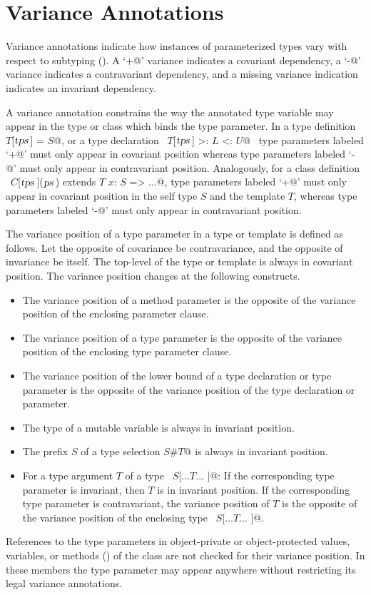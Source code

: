 \section{Variance Annotations}\label{sec:variances}

Variance annotations indicate how instances of parameterized types
vary with respect to subtyping ().  A
`\lstinline@+@' variance indicates a covariant dependency, a
`\lstinline@-@' variance indicates a contravariant dependency, and a
missing variance indication indicates an invariant dependency.

A variance annotation constrains the way the annotated type variable
may appear in the type or class which binds the type parameter.  In a
type definition ~\lstinline@type $T$[$\mbox{\sl tps}\,$] = $S$@, or a type 
declaration ~\lstinline@type $T$[$\mbox{\sl tps}\,$] >: $L$ <: $U$@~ type parameters labeled
`\lstinline@+@' must only appear in covariant position whereas
type parameters labeled `\lstinline@-@' must only appear in contravariant
position. Analogously, for a class definition
~\lstinline@class $C$[$\mbox{\sl tps}\,$]($\mbox{\sl ps}\,$) extends $T$ { $x$: $S$ => ...}@, 
type parameters labeled
`\lstinline@+@' must only appear in covariant position in the
self type $S$ and the template $T$, whereas type
parameters labeled `\lstinline@-@' must only appear in contravariant
position. 

The variance position of a type parameter in a type or template is
defined as follows.  Let the opposite of covariance be contravariance,
and the opposite of invariance be itself.  The top-level of the type
or template is always in covariant position. The variance position
changes at the following constructs.
\begin{itemize}
\item
The variance position of a method parameter is the opposite of the 
variance position of the enclosing parameter clause.
\item
The variance position of a type parameter is the opposite of the
variance position of the enclosing type parameter clause.
\item
The variance position of the lower bound of a type declaration or type parameter 
is the opposite of the variance position of the type declaration or parameter.  
\item
The type of a mutable variable is always in invariant position.
\item 
The prefix $S$ of a type selection \lstinline@$S$#$T$@ is always in invariant position.
\item
For a type argument $T$ of a type ~\lstinline@$S$[$\ldots T \ldots$ ]@: If the
corresponding type parameter is invariant, then $T$ is in
invariant position.  If the corresponding type parameter is
contravariant, the variance position of $T$ is the opposite of
the variance position of the enclosing type ~\lstinline@$S$[$\ldots T \ldots$ ]@.
\end{itemize}
References to the type parameters in object-private or object-protected values, variables,
or methods () of the class are not checked for their variance
position. In these members the type parameter may appear anywhere
without restricting its legal variance annotations.

